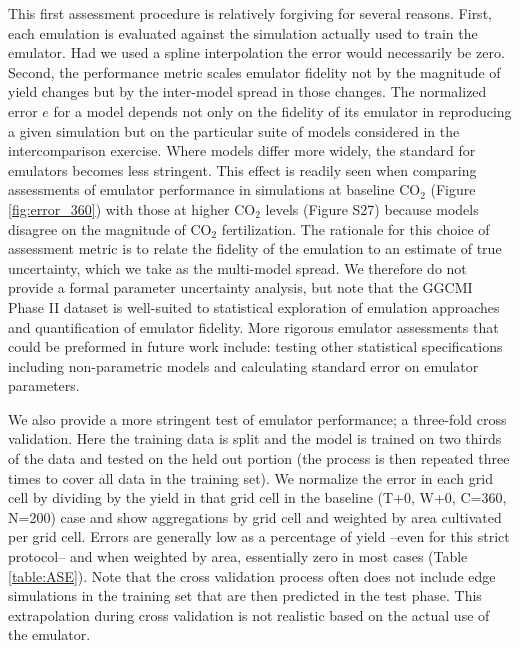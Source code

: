 \documentclass[gmd, manuscript]{copernicus} %
\begin{document}
This first assessment procedure is relatively forgiving for several reasons. First, each emulation is evaluated against the simulation actually used to train the emulator. Had we used a spline interpolation the error would necessarily be zero. Second, the performance metric scales emulator fidelity not by the magnitude of yield changes but by the inter-model spread in those changes. The normalized error $e$ for a model depends not only on the fidelity of its emulator in reproducing a given simulation but on the particular suite of models considered in the intercomparison exercise. Where models differ more widely, the standard for emulators becomes less stringent. This effect is readily seen when comparing assessments of emulator performance in simulations at baseline CO$_2$ (Figure \ref{fig:error_360}) with those at higher CO$_2$ levels (Figure S27) because models disagree on the magnitude of CO$_2$ fertilization. The rationale for this choice of assessment metric is to relate the fidelity of the emulation to an estimate of true uncertainty, which we take as the multi-model spread. We therefore do not provide a formal parameter uncertainty analysis, but note that the GGCMI Phase II dataset is well-suited to statistical exploration of emulation approaches and quantification of emulator fidelity. More rigorous emulator assessments that could be preformed in future work include: testing other statistical specifications including non-parametric models and calculating standard error on emulator parameters.

We also provide a more stringent test of emulator performance; a three-fold cross validation. Here the training data is split and the model is trained on two thirds of the data and tested on the held out portion (the process is then repeated three times to cover all data in the training set). We normalize the error in each grid cell by dividing by the yield in that grid cell in the baseline (T+0, W+0, C=360, N=200) case and show aggregations by grid cell and weighted by area cultivated per grid cell. Errors are generally low as a percentage of yield --even for this strict protocol-- and when weighted by area, essentially zero in most cases (Table \ref{table:ASE}). Note that the cross validation process often does not include edge simulations in the training set that are then predicted in the test phase. This extrapolation during cross validation is not realistic based on the actual use of the emulator.
\end{document}

